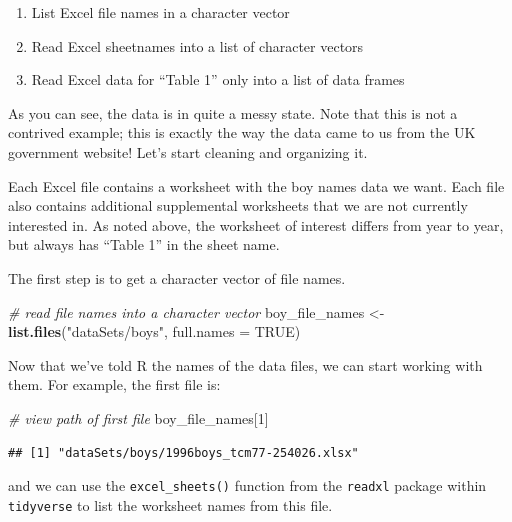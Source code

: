 \documentclass[
]{book}
\newenvironment{Shaded}{\begin{snugshade}}{\end{snugshade}}
\newcommand{\CommentTok}[1]{\textcolor[rgb]{0.56,0.35,0.01}{\textit{#1}}}
\newcommand{\DataTypeTok}[1]{\textcolor[rgb]{0.13,0.29,0.53}{#1}}
\newcommand{\DecValTok}[1]{\textcolor[rgb]{0.00,0.00,0.81}{#1}}
\newcommand{\KeywordTok}[1]{\textcolor[rgb]{0.13,0.29,0.53}{\textbf{#1}}}
\newcommand{\NormalTok}[1]{#1}
\newcommand{\OtherTok}[1]{\textcolor[rgb]{0.56,0.35,0.01}{#1}}
\newcommand{\StringTok}[1]{\textcolor[rgb]{0.31,0.60,0.02}{#1}}
\providecommand{\tightlist}{%
  \setlength{\itemsep}{0pt}\setlength{\parskip}{0pt}}
\begin{document}
\begin{enumerate}
\def\labelenumi{\arabic{enumi}.}
\tightlist
\item
  List Excel file names in a character vector
\item
  Read Excel sheetnames into a list of character vectors
\item
  Read Excel data for ``Table 1'' only into a list of data frames
\end{enumerate}

As you can see, the data is in quite a messy state. Note that this is not a contrived example; this is exactly the way the data came to us from the UK government website! Let's start cleaning and organizing it.

Each Excel file contains a worksheet with the boy names data we want. Each file also contains additional supplemental worksheets that we are not currently interested in. As noted above, the worksheet of interest differs from year to year, but always has ``Table 1'' in the sheet name.

The first step is to get a character vector of file names.

\begin{Shaded}
\begin{Highlighting}[]
\CommentTok{\# read file names into a character vector}
\NormalTok{boy\_file\_names \textless{}{-}}\StringTok{ }\KeywordTok{list.files}\NormalTok{(}\StringTok{"dataSets/boys"}\NormalTok{, }\DataTypeTok{full.names =} \OtherTok{TRUE}\NormalTok{)}
\end{Highlighting}
\end{Shaded}

Now that we've told R the names of the data files, we can start working with them. For example, the first file is:

\begin{Shaded}
\begin{Highlighting}[]
\CommentTok{\# view path of first file}
\NormalTok{boy\_file\_names[}\DecValTok{1}\NormalTok{]}
\end{Highlighting}
\end{Shaded}

\begin{verbatim}
## [1] "dataSets/boys/1996boys_tcm77-254026.xlsx"
\end{verbatim}

and we can use the \texttt{excel\_sheets()} function from the \texttt{readxl} package within \texttt{tidyverse} to list the worksheet names from this file.
\end{document}
